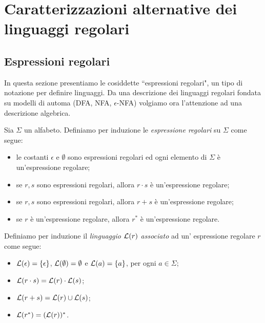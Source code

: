 \documentclass[runningheads,a4paper]{llncs}
\begin{document}
\section{Caratterizzazioni alternative dei linguaggi regolari}

\subsection{Espressioni regolari}

In questa sezione presentiamo le cosiddette ``espressioni regolari", un tipo di notazione per definire linguaggi. Da una descrizione dei linguaggi regolari fondata su modelli di automa (DFA, NFA, $\epsilon$-NFA) volgiamo ora l'attenzione ad una descrizione algebrica. 

\begin{definition}\label{def:regexp}
Sia $\Sigma$ un alfabeto. Definiamo per induzione le \emph{espressione regolari} su $\Sigma$ come segue:
\begin{itemize}
\item le costanti $\epsilon$ e $\emptyset$ sono espressioni regolari ed ogni elemento di $\Sigma$ \`{e} un'espressione regolare;
\item se $r,s$ sono espressioni regolari, allora $r \cdot s$ \`{e} un'espressione regolare;
\item se $r,s$ sono espressioni regolari, allora $r + s$ \`{e} un'espressione regolare;
\item se $r$ \`{e} un'espressione regolare, allora $r^*$ \`{e} un'espressione regolare.
\end{itemize} 
\end{definition}

\begin{definition}\label{def:lin-regexp}
Definiamo per induzione il \emph{linguaggio $\mathcal{L}(r)$ associato} ad un' espressione regolare $r$ come segue:
\begin{itemize}
\item $\mathcal{L}(\epsilon) = \{\epsilon\}$, $\mathcal{L}(\emptyset) = \emptyset$ e $\mathcal{L}(a) = \{a\}$, per ogni $a \in \Sigma$;
\item $\mathcal{L}(r\cdot s) = \mathcal{L}(r)\cdot \mathcal{L}(s)$;
\item $\mathcal{L}(r+ s) = \mathcal{L}(r)\cup \mathcal{L}(s)$;
\item $\mathcal{L}(r^*) = (\mathcal{L}(r))^*$.
\end{itemize} 
\end{definition}
\end{document}
